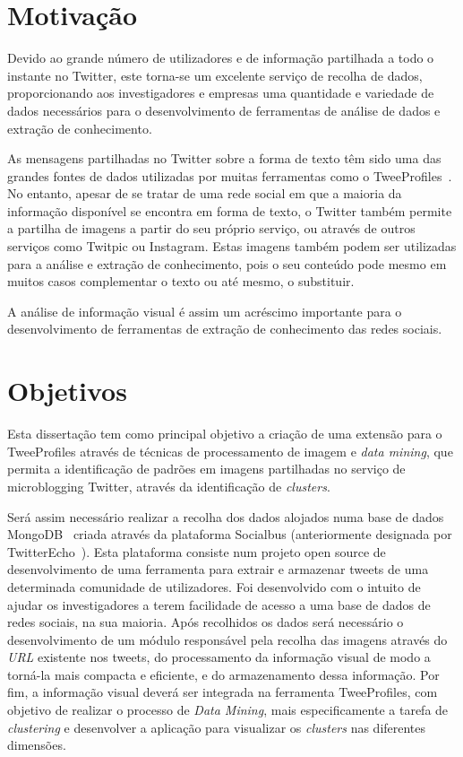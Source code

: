 \section{Motivação} \label{sec:motiv}

Devido ao grande número de utilizadores e de informação partilhada a todo o instante no Twitter, este torna-se um excelente serviço de recolha de dados, proporcionando aos investigadores e empresas uma quantidade e variedade de dados necessários para o desenvolvimento de ferramentas de análise de dados e extração de conhecimento.

As mensagens partilhadas no Twitter sobre a forma de texto têm sido uma das grandes fontes de dados utilizadas por muitas ferramentas como o TweeProfiles~\citet{Cunha2013}. No entanto, apesar de se tratar de uma rede social em que a maioria da informação disponível se encontra em forma de texto, o Twitter também permite a partilha de imagens a partir do seu próprio serviço, ou através de outros serviços como Twitpic ou Instagram. Estas imagens também podem ser utilizadas para a análise e extração de conhecimento, pois o seu conteúdo pode mesmo em muitos casos complementar o texto ou até mesmo, o substituir.

A análise de informação visual é assim um acréscimo importante para o desenvolvimento de ferramentas de extração de conhecimento das redes sociais. 

\section{Objetivos} \label{sec:object}

Esta dissertação tem como principal objetivo a criação de uma extensão para o TweeProfiles através de técnicas de processamento de imagem e \textit{data mining}, que permita a identificação de padrões em imagens partilhadas no serviço de microblogging Twitter, através da identificação de \textit{clusters}.

Será assim necessário realizar a recolha dos dados alojados numa base de dados MongoDB~\cite{mongodb} criada através da plataforma Socialbus (anteriormente designada por TwitterEcho~\cite{Boanjak2012}). Esta plataforma consiste num projeto open source de desenvolvimento de uma ferramenta para extrair e armazenar tweets de uma determinada comunidade de utilizadores. Foi desenvolvido com o intuito de ajudar os investigadores a terem facilidade de acesso a uma base de dados de redes sociais, na sua maioria. Após recolhidos os dados será necessário o desenvolvimento de um módulo responsável pela recolha das imagens através do \textit{URL} existente nos tweets, do processamento da informação visual de modo a torná-la mais compacta e eficiente, e do armazenamento dessa informação. Por fim, a informação visual deverá ser integrada na ferramenta TweeProfiles, com objetivo de realizar o processo de \textit{Data Mining}, mais especificamente a tarefa de \textit{clustering} e desenvolver a aplicação para visualizar os \textit{clusters} nas diferentes dimensões. 

